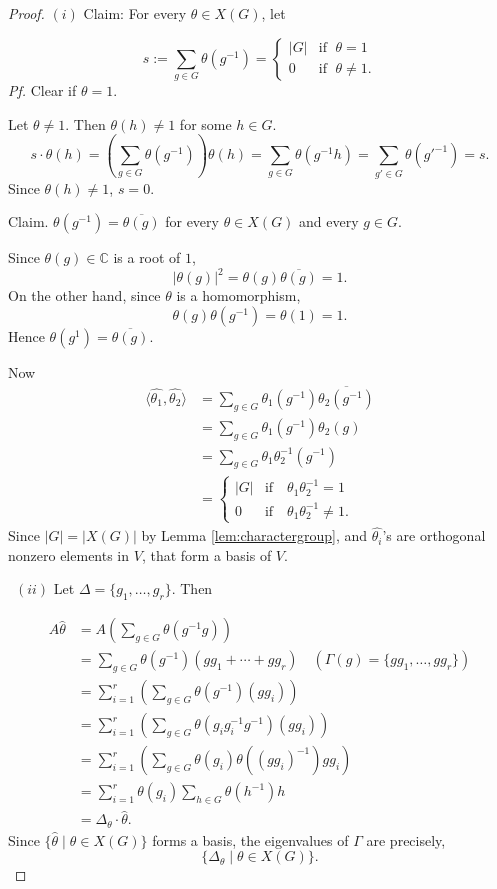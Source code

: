\documentclass[
]{book}
\theoremstyle{definition}
\theoremstyle{definition}
\theoremstyle{definition}
\theoremstyle{definition}
\theoremstyle{remark}
\begin{document}
\begin{proof}
\leavevmode

\((i)\) Claim: For every \(\theta \in X(G)\), let

\[s:= \sum_{g\in G}\theta(g^{-1}) = \begin{cases} |G| & \text{if }\;\theta = 1\\
0 & \text{if } \;\theta \neq 1. 
\end{cases}\]
\emph{Pf.} Clear if \(\theta =1\).

Let \(\theta \neq 1\). Then \(\theta(h)\neq 1\) for some \(h\in G\).
\[s\cdot \theta(h) = \left(\sum_{g\in G}\theta(g^{-1})\right)\theta(h) = \sum_{g\in G}\theta(g^{-1}h) = \sum_{g'\in G}\theta(g'^{-1}) = s.\]
Since \(\theta(h)\neq 1\), \(s = 0\).

Claim. \(\theta(g^{-1}) = \overline{\theta(g)}\) for every \(\theta\in X(G)\) and every \(g\in G\).

Since \(\theta(g)\in \mathbb{C}\) is a root of \(1\),
\[|\theta(g)|^2 = \theta(g)\overline{\theta(g)} = 1.\]
On the other hand, since \(\theta\) is a homomorphism,
\[\theta(g)\theta(g^{-1}) = \theta(1) = 1.\]
Hence \(\theta(g^{1}) = \overline{\theta(g)}\).

Now
\begin{align}
\langle \widehat{\theta_1}, \widehat{\theta_2}\rangle & = \sum_{g\in G}\theta_1(g^{-1})\overline{\theta_2(g^{-1})}\\
& = \sum_{g\in G}\theta_1(g^{-1})\theta_2(g)\\
& = \sum_{g\in G}\theta_1\theta_2^{-1}(g^{-1})\\
& = \begin{cases} |G| & \text{if}\quad \theta_1\theta_2^{-1} = 1\\
0 & \text{if} \quad \theta_1\theta_2^{-1}\neq 1.
\end{cases}
\end{align}
Since \(|G| = |X(G)|\) by Lemma \ref{lem:charactergroup}, and \(\widehat{\theta_i}\)'s are orthogonal nonzero elements in \(V\), that form a basis of \(V\).

~\((ii)\) Let \(\Delta = \{g_1, \ldots, g_r\}\). Then

\begin{align}
A\hat{\theta} & = A\left(\sum_{g\in G}\theta(g^{-1}g)\right)\\
& = \sum_{g\in G}\theta(g^{-1})(gg_1 + \cdots + gg_r) \quad (\Gamma(g) = \{gg_1, \ldots, gg_r\})\\
& = \sum_{i = 1}^r \left(\sum_{g\in G}\theta(g^{-1})(gg_i)\right)\\
& = \sum_{i=1}^r\left(\sum_{g\in G}\theta(g_ig_i^{-1}g^{-1})(gg_i)\right)\\
& = \sum_{i = 1}^r\left(\sum_{g\in G}\theta(g_i)\theta((gg_i)^{-1})gg_i\right)\\
& = \sum_{i = 1}^r\theta(g_i)\sum_{h\in G}\theta(h^{-1})h \\
& = \Delta_\theta\cdot \hat{\theta}.
\end{align}
Since \(\{\hat{\theta}\mid \theta\in X(G)\}\) forms a basis, the eigenvalues of \(\Gamma\) are precisely,
\[\{\Delta_\theta\mid \theta\in X(G)\}.\]


\end{proof}
\end{document}
